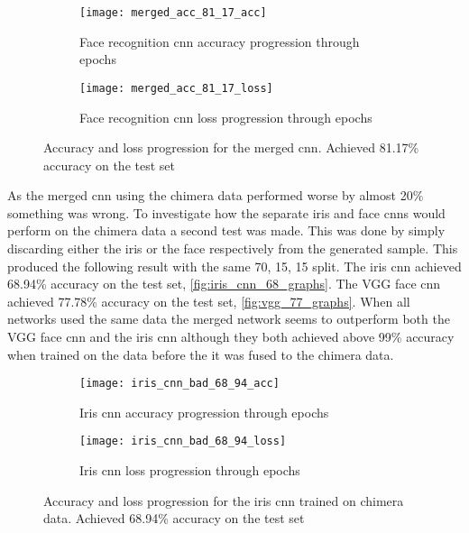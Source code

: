 \begin{figure}[H]
	\centering
	\begin{subfigure}{0.48\textwidth}
		\centering
		\texttt{[image: merged\_acc\_81\_17\_acc]}
		\caption{Face recognition \gls{cnn} accuracy progression through epochs}
		\label{fig:merged_acc}
	\end{subfigure}
	\begin{subfigure}{0.48\textwidth}
		\centering
		\texttt{[image: merged\_acc\_81\_17\_loss]}
		\caption{Face recognition \gls{cnn} loss progression through epochs}
		\label{fig:merged_loss}
	\end{subfigure}
	\caption{Accuracy and loss progression for the merged \gls{cnn}. Achieved 81.17\% accuracy on the test set}
	\label{fig:merged_graphs}
\end{figure}

\noindent As the merged \gls{cnn} using the chimera data performed worse by almost 20\% something was wrong. To investigate how the separate iris and face \gls{cnn}s would perform on the chimera data a second test was made. This was done by simply discarding either the iris or the face respectively from the generated sample. This produced the following result with the same 70, 15, 15 split.  The iris \gls{cnn} achieved 68.94\% accuracy on the test set, \autoref{fig:iris_cnn_68_graphs}. The VGG face \gls{cnn} achieved 77.78\% accuracy on the test set, \autoref{fig:vgg_77_graphs}. When all networks used the same data the merged network seems to outperform both the VGG face \gls{cnn} and the iris \gls{cnn} although they both achieved above 99\% accuracy when trained on the data before the it was fused to the chimera data.

\begin{figure}[H]
	\centering
	\begin{subfigure}{0.48\textwidth}
		\centering
		\texttt{[image: iris\_cnn\_bad\_68\_94\_acc]}
		\caption{Iris \gls{cnn} accuracy progression through epochs}
		\label{fig:iris_cnn_68_acc}
	\end{subfigure}
	\begin{subfigure}{0.48\textwidth}
		\centering
		\texttt{[image: iris\_cnn\_bad\_68\_94\_loss]}
		\caption{Iris \gls{cnn} loss progression through epochs}
		\label{fig:iris_cnn_68_loss}
	\end{subfigure}
	\caption{Accuracy and loss progression for the iris \gls{cnn} trained on chimera data. Achieved 68.94\% accuracy on the test set}
	\label{fig:iris_cnn_68_graphs}
\end{figure}


